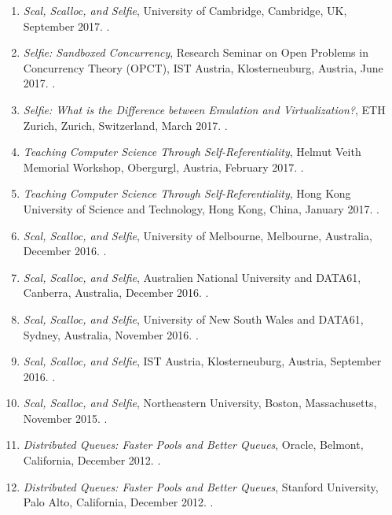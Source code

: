 {\begin{enumerate}
\item \emph{Scal, Scalloc, and Selfie}, University of Cambridge, Cambridge, UK, September 2017.
.

\item \emph{Selfie: Sandboxed Concurrency},
Research Seminar on Open Problems in Concurrency Theory (OPCT), IST Austria, Klosterneuburg, Austria, June 2017.
.

\item \emph{Selfie: What is the Difference between Emulation and Virtualization?},
ETH Zurich, Zurich, Switzerland, March 2017.
.

\item \emph{Teaching Computer Science Through Self-Referentiality},
Helmut Veith Memorial Workshop, Obergurgl, Austria, February 2017.
.

\item \emph{Teaching Computer Science Through Self-Referentiality},
Hong Kong University of Science and Technology, Hong Kong, China, January 2017.
.

\item \emph{Scal, Scalloc, and Selfie},
University of Melbourne, Melbourne, Australia, December 2016.
.

\item \emph{Scal, Scalloc, and Selfie},
Australien National University and DATA61, Canberra, Australia, December 2016.
.

\item \emph{Scal, Scalloc, and Selfie},
University of New South Wales and DATA61, Sydney, Australia, November 2016.
.

\item \emph{Scal, Scalloc, and Selfie},
IST Austria, Klosterneuburg, Austria, September 2016.
.

\item \emph{Scal, Scalloc, and Selfie},
Northeastern University, Boston, Massachusetts, November 2015.
.

\item \emph{Distributed Queues: Faster Pools and Better Queues},
Oracle, Belmont, California, December 2012.
.

\item \emph{Distributed Queues: Faster Pools and Better Queues},
Stanford University, Palo Alto, California, December 2012.
.


\end{enumerate}}
